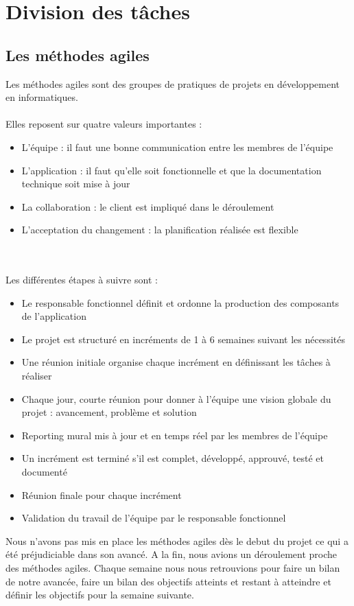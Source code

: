 \section{Division des tâches}

\subsection{Les méthodes agiles}
Les méthodes agiles sont des groupes de pratiques de projets en développement en informatiques.\\
\\
Elles reposent sur quatre valeurs importantes : \\
\begin{itemize}
\item{L'équipe : il faut une bonne communication entre les membres de l'équipe}
\item{L'application : il faut qu'elle soit fonctionnelle et que la documentation technique soit mise à jour}
\item{La collaboration : le client est impliqué dans le déroulement}
\item{L'acceptation du changement : la planification réalisée est flexible}
\end{itemize} 
~\\
~\\
Les différentes étapes à suivre sont : \\
\begin{itemize}
\item{Le responsable fonctionnel définit et ordonne la production des composants de l'application}
\item{Le projet est structuré en incréments de 1 à 6 semaines suivant les nécessités}
\item{Une réunion initiale organise chaque incrément en définissant les tâches à réaliser}
\item{Chaque jour, courte réunion pour donner à l'équipe une vision globale du projet : avancement, problème et solution}
\item{Reporting mural mis à jour et en temps réel par les membres de l'équipe}
\item{Un incrément est terminé s'il est complet, développé, approuvé, testé et documenté}
\item{Réunion finale pour chaque incrément}
\item{Validation du travail de l'équipe par le responsable fonctionnel}
\end{itemize}

Nous n'avons pas mis en place les méthodes agiles dès le debut du projet ce qui a été préjudiciable dans son avancé. A la fin, nous avions un déroulement proche des méthodes agiles. Chaque semaine nous nous retrouvions pour faire un bilan de notre avancée, faire un bilan des objectifs atteints et restant à atteindre et définir les objectifs pour la semaine suivante. 
